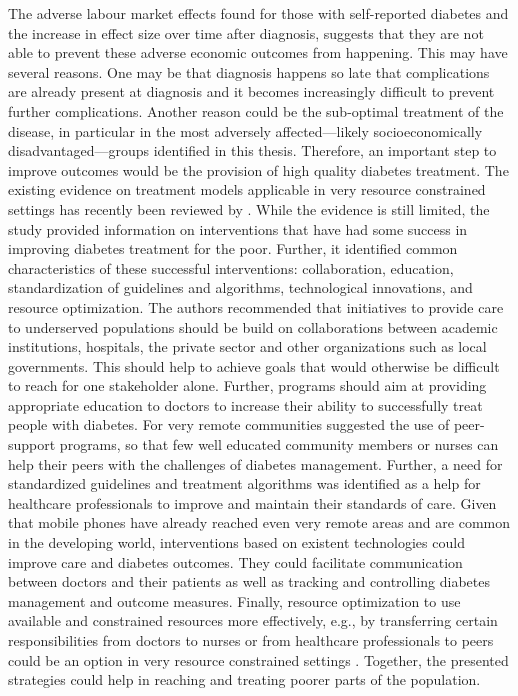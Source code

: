 The adverse labour market effects found for those with self-reported diabetes and the increase in effect size over time after diagnosis, suggests that they are not able to prevent these adverse economic outcomes from happening. This may have several reasons. One may be that diagnosis happens so late that complications are already present at diagnosis and it becomes increasingly difficult to prevent further complications. Another reason could be the sub-optimal treatment of the disease, in particular in the most adversely affected---likely socioeconomically disadvantaged---groups identified in this thesis.
Therefore, an important step to improve outcomes would be the provision of high quality diabetes treatment. The existing evidence on treatment models applicable in very resource constrained settings has recently been reviewed by \textcite{Esterson2014}. While the evidence is still limited, the study provided information on interventions that have had some success in improving diabetes treatment for the poor. Further, it identified common characteristics of these successful interventions: collaboration, education, standardization of guidelines and algorithms, technological innovations, and resource optimization. The authors recommended that initiatives to provide care to underserved populations should be build on collaborations between academic institutions, hospitals, the private sector and other organizations such as local governments. This should help to achieve goals that would otherwise be difficult to reach for one stakeholder alone. Further, programs should aim at providing appropriate education to doctors to increase their ability to successfully treat people with diabetes. For very remote communities \textcite{Esterson2014} suggested the use of peer-support programs, so that few well educated community members or nurses can help their peers with the challenges of diabetes management. Further, a need for standardized guidelines and treatment algorithms was identified as a help for healthcare professionals to improve and maintain their standards of care. Given that mobile phones have already reached even very remote areas and are common in the developing world, interventions based on existent technologies could improve care and diabetes outcomes. They could facilitate communication between doctors and their patients as well as tracking and controlling diabetes management and outcome measures. Finally, resource optimization to use available and constrained resources more effectively, e.g., by transferring certain responsibilities from doctors to nurses or from healthcare professionals to peers could be an option in very resource constrained settings \parencite{Esterson2014}. Together, the presented strategies could help in reaching and treating poorer parts of the population.

